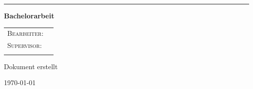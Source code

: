 \documentclass{article}
\begin{document}
\newenvironment{code}{\captionsetup{type=listing}}{}

\addtolength{\belowcaptionskip}{5pt}
\addtolength{\abovecaptionskip}{-5pt}



\let\oldcontentsname\contentsname
\renewcommand{\contentsname}{\centering\small\oldcontentsname}

\title{\thesistitle}
\author{\authorA {} \authorB}
\date{\today}

\begin{titlepage}
	\centering
    \BgThispage
    \vspace*{-\topmargin}\vspace{-1in}%
    \vspace*{-\headheight}\vspace{-\headsep}%
    \vspace*{-\topskip}%
    \hspace*{-\oddsidemargin}
    \hspace*{-\marginparsep}
    \hspace*{-\marginparwidth}
	\vspace*{1.75cm}
	\par
    {\huge\bfseries\thesistitle\par}
    \noindent\rule{\textwidth}{0.3pt} 
    {\LARGE\bfseries Bachelorarbeit \par}
	\vspace*{1.75cm}
	\large \begin{tabular}{ l l }
	  \textsc{Bearbeiter}:&{\thesisauthor}
	  \\
	  \textsc{Supervisor:}&{\supervisor}\\
	  \\
	\end{tabular}
	\par
	\vspace*{1.75cm}
	\begin{otherlanguage}{ngerman}
		{\large Dokument erstellt\par\today\par}
	\end{otherlanguage}
	\newpage
	\thispagestyle{empty}
	\mbox{}
	\newpage
\end{titlepage}
\end{document}

